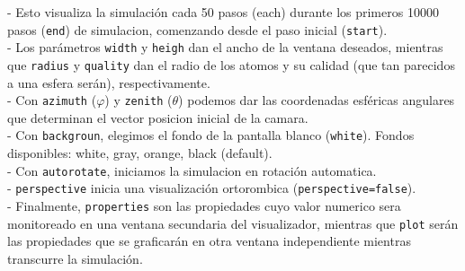 - Esto visualiza la simulaci\'on cada 50 pasos (each) durante los primeros 10000 pasos (\verb+end+) de simulacion, comenzando desde el paso inicial (\verb+start+).\\

- Los par\'ametros \verb+width+ y \verb+heigh+ dan el ancho de la ventana deseados, mientras que \verb+radius+ y \verb+quality+ dan el radio de los atomos y su calidad (que tan parecidos a una esfera ser\'an), respectivamente.\\

- Con \verb+azimuth+ ($\varphi$) y \verb+zenith+ ($\theta$) podemos dar las coordenadas esf\'ericas angulares que determinan el vector posicion inicial de la camara.\\

- Con \verb+backgroun+, elegimos el fondo de la pantalla blanco (\verb+white+). Fondos disponibles: white, gray, orange, black (default).\\

- Con \verb+autorotate+, iniciamos la simulacion en rotaci\'on automatica.\\

- \verb+perspective+ inicia una visualizaci\'on ortorombica (\verb+perspective=false+).\\

- Finalmente, \verb+properties+ son las propiedades cuyo valor numerico sera monitoreado en una ventana secundaria del visualizador, mientras que \verb+plot+ ser\'an las propiedades que se graficar\'an en otra ventana independiente mientras transcurre la simulaci\'on.                         



